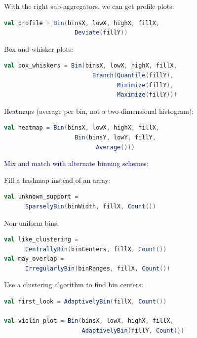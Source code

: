 \documentclass{beamer}
\begin{document}
\begin{frame}[fragile]{}
With the right sub-aggregators, we can get profile plots:
\begin{lstlisting}[language=scala]
val profile = Bin(binsX, lowX, highX, fillX,
                    Deviate(fillY))
\end{lstlisting}

Box-and-whisker plots:
\begin{lstlisting}[language=scala]
val box_whiskers = Bin(binsX, lowX, highX, fillX,
                         Branch(Quantile(fillY),
                                Minimize(fillY),
                                Maximize(fillY)))
\end{lstlisting}

Heatmaps (average per bin, not a two-dimensional histogram):
\begin{lstlisting}[language=scala]
val heatmap = Bin(binsX, lowX, highX, fillX,
                    Bin(binsY, lowY, fillY,
                          Average()))
\end{lstlisting}
\end{frame}

\begin{frame}[fragile]{}
\textcolor{darkblue}{\large Mix and match with alternate binning schemes:}

\vspace{0.5 cm}
Fill a hashmap instead of an array:
\begin{lstlisting}[language=scala]
val unknown_support =
      SparselyBin(binWidth, fillX, Count())
\end{lstlisting}

Non-uniform bins:
\begin{lstlisting}[language=scala]
val like_clustering =
      CentrallyBin(binCenters, fillX, Count())
val may_overlap =
      IrregularlyBin(binRanges, fillX, Count())
\end{lstlisting}

Use a clustering algorithm to find bin centers:
\begin{lstlisting}[language=scala]
val first_look = AdaptivelyBin(fillX, Count())

val violin_plot = Bin(binsX, lowX, highX, fillX,
                      AdaptivelyBin(fillY, Count())
\end{lstlisting}
\end{frame}
\end{document}
